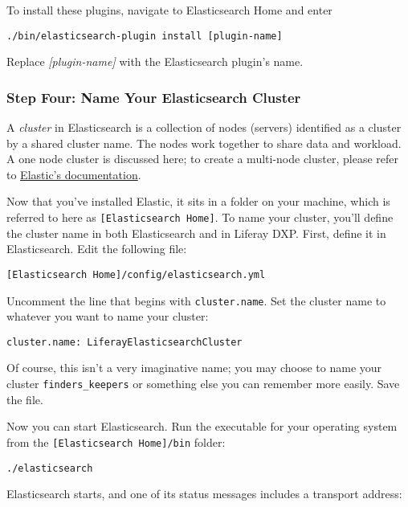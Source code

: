 To install these plugins, navigate to Elasticsearch Home and enter

\begin{verbatim}
./bin/elasticsearch-plugin install [plugin-name]
\end{verbatim}

Replace \emph{{[}plugin-name{]}} with the Elasticsearch plugin's name.

\subsubsection{Step Four: Name Your Elasticsearch
Cluster}\label{step-four-name-your-elasticsearch-cluster}

A \emph{cluster} in Elasticsearch is a collection of nodes (servers)
identified as a cluster by a shared cluster name. The nodes work
together to share data and workload. A one node cluster is discussed
here; to create a multi-node cluster, please refer to
\href{https://www.elastic.co/guide/index.html}{Elastic's documentation}.

Now that you've installed Elastic, it sits in a folder on your machine,
which is referred to here as \texttt{{[}Elasticsearch\ Home{]}}. To name
your cluster, you'll define the cluster name in both Elasticsearch and
in Liferay DXP. First, define it in Elasticsearch. Edit the following
file:

\begin{verbatim}
[Elasticsearch Home]/config/elasticsearch.yml
\end{verbatim}

Uncomment the line that begins with \texttt{cluster.name}. Set the
cluster name to whatever you want to name your cluster:

\begin{verbatim}
cluster.name: LiferayElasticsearchCluster
\end{verbatim}

Of course, this isn't a very imaginative name; you may choose to name
your cluster \texttt{finders\_keepers} or something else you can
remember more easily. Save the file.

Now you can start Elasticsearch. Run the executable for your operating
system from the \texttt{{[}Elasticsearch\ Home{]}/bin} folder:

\begin{verbatim}
./elasticsearch
\end{verbatim}

Elasticsearch starts, and one of its status messages includes a
transport address:


